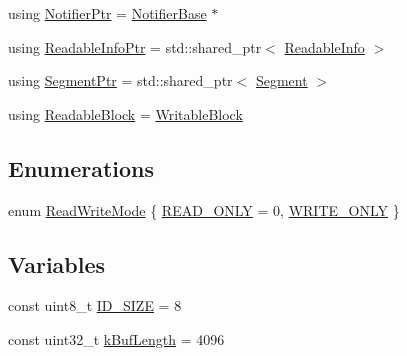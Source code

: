\begin{DoxyCompactItemize}
\item 
using \hyperlink{namespaceapollo_1_1cyber_1_1transport_ad7de1bbf34457c17c4d04b9bbfe152b4}{Notifier\-Ptr} = \hyperlink{classapollo_1_1cyber_1_1transport_1_1NotifierBase}{Notifier\-Base} $\ast$
\item 
using \hyperlink{namespaceapollo_1_1cyber_1_1transport_a05661242213cefca12ed465da1e95baf}{Readable\-Info\-Ptr} = std\-::shared\-\_\-ptr$<$ \hyperlink{classapollo_1_1cyber_1_1transport_1_1ReadableInfo}{Readable\-Info} $>$
\item 
using \hyperlink{namespaceapollo_1_1cyber_1_1transport_ae92e21f5ec6b011ba398cd6907465406}{Segment\-Ptr} = std\-::shared\-\_\-ptr$<$ \hyperlink{classapollo_1_1cyber_1_1transport_1_1Segment}{Segment} $>$
\item 
using \hyperlink{namespaceapollo_1_1cyber_1_1transport_a38f70b996ac896a1bc06d4598f1d0070}{Readable\-Block} = \hyperlink{structapollo_1_1cyber_1_1transport_1_1WritableBlock}{Writable\-Block}
\end{DoxyCompactItemize}
\subsection*{Enumerations}
\begin{DoxyCompactItemize}
\item 
enum \hyperlink{namespaceapollo_1_1cyber_1_1transport_a020d15a7a063c0bdae65bd0a96c4a960}{Read\-Write\-Mode} \{ \hyperlink{namespaceapollo_1_1cyber_1_1transport_a020d15a7a063c0bdae65bd0a96c4a960a4810bf6f9e574f946ab7a289b50a65a5}{R\-E\-A\-D\-\_\-\-O\-N\-L\-Y} = 0, 
\hyperlink{namespaceapollo_1_1cyber_1_1transport_a020d15a7a063c0bdae65bd0a96c4a960a7a911f1cdd8110d4179e533edbe508fc}{W\-R\-I\-T\-E\-\_\-\-O\-N\-L\-Y}
 \}
\end{DoxyCompactItemize}
\subsection*{Variables}
\begin{DoxyCompactItemize}
\item 
const uint8\-\_\-t \hyperlink{namespaceapollo_1_1cyber_1_1transport_a5c7448aa493a6ccbc3191720dc7a15ce}{I\-D\-\_\-\-S\-I\-Z\-E} = 8
\item 
const uint32\-\_\-t \hyperlink{namespaceapollo_1_1cyber_1_1transport_a12bcc39dba9d39eab46f409750a9e1e8}{k\-Buf\-Length} = 4096
\end{DoxyCompactItemize}


